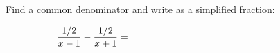 Find a common denominator and write as a simplified fraction:

    $$\frac{1/2}{x-1} - \frac{1/2}{x+1} = \hspace{2.5in}$$
